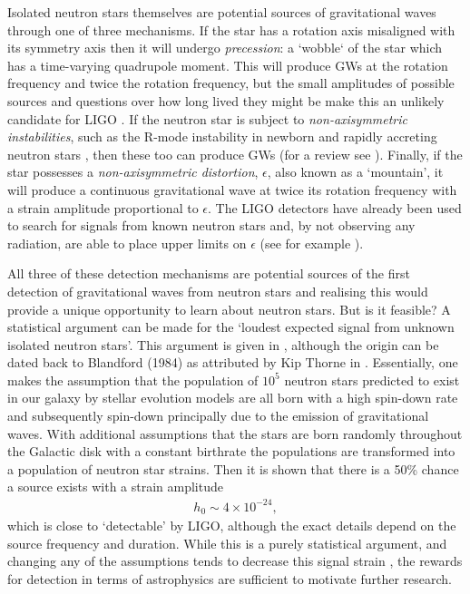 Isolated neutron stars themselves are potential sources of gravitational waves
through one of three mechanisms. If the star has a rotation axis misaligned
with its symmetry axis then it will undergo \emph{precession}: a `wobble` of
the star which has a time-varying quadrupole moment. This will produce GWs at
the rotation frequency and twice the rotation frequency, but the small
amplitudes of possible sources and questions over how long lived they might be
make this an unlikely candidate for LIGO \citep{Jones2002}. If the neutron star
is subject to \emph{non-axisymmetric instabilities}, such as the R-mode
instability in newborn and rapidly accreting neutron stars
\citep{andersson2001r}, then these too can produce GWs (for a review see
\citet{andersson2003gravitational}).  Finally, if the star possesses a
\emph{non-axisymmetric distortion}, $\epsilon$, also known as a `mountain', it
will produce a continuous gravitational wave at twice its rotation frequency
with a strain amplitude proportional to $\epsilon$. The LIGO detectors have
already been used to search for signals from known neutron stars and, by not
observing any radiation, are able to place upper limits on $\epsilon$ (see for
example \citet{abbott2008beating, abadie2011beating}).

All three of these detection mechanisms are potential sources of the first
detection of gravitational waves from neutron stars and realising this would
provide a unique opportunity to learn about neutron stars. But is it feasible?
A statistical argument can be made for the `loudest expected signal from
unknown isolated neutron stars'. This argument is given in
\citet{abbott2007searches}, although the origin can be dated back to Blandford
(1984) as attributed by Kip Thorne in \citet{Hawking1989}. Essentially, one
makes the assumption that the population of $10^{5}$ neutron stars predicted to
exist in our galaxy by stellar evolution models are all born with a high
spin-down rate and subsequently spin-down principally due to the emission of
gravitational waves. With additional assumptions that the stars are born
randomly throughout the Galactic disk with a constant birthrate the populations
are transformed into a population of neutron star strains. Then it is shown
that there is a 50\% chance a source exists with a strain amplitude
\begin{align}
h_0 \sim 4 \times 10^{-24},
\end{align}
which is close to `detectable' by LIGO, although the exact details depend on the
source frequency and duration. While this is a purely statistical argument, and
changing any of the assumptions tends to decrease this signal strain
\citep{Prix2009}, the rewards for detection in terms of astrophysics are
sufficient to motivate further research.

